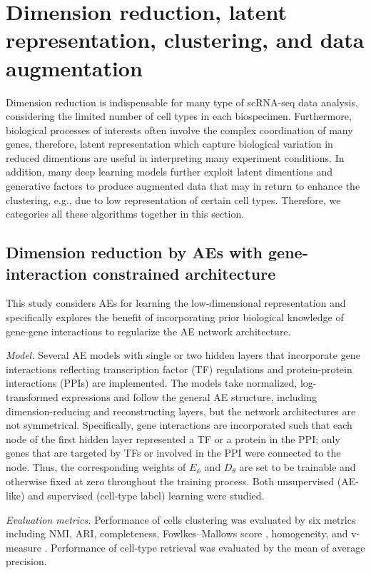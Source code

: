 \documentclass[
]{book}
\begin{document}
\hypertarget{ch-5-3}{%
\section{Dimension reduction, latent representation, clustering, and data augmentation}\label{ch-5-3}}

Dimension reduction is indispensable for many type of scRNA-seq data analysis, considering the limited number of cell types in each biospecimen. Furthermore, biological processes of interests often involve the complex coordination of many genes, therefore, latent representation which capture biological variation in reduced dimentions are useful in interpreting many experiment conditions. In addition, many deep learning models further exploit latent dimentions and generative factors to produce augmented data that may in return to enhance the clustering, e.g., due to low representation of certain cell types. Therefore, we categories all these algorithms together in this section.

\hypertarget{ch-5-3-1}{%
\subsection{Dimension reduction by AEs with gene-interaction constrained architecture}\label{ch-5-3-1}}

This study \citep{RN193} considers AEs for learning the low-dimensional representation and specifically explores the benefit of incorporating prior biological knowledge of gene-gene interactions to regularize the AE network architecture.

\emph{Model.} Several AE models with single or two hidden layers that incorporate gene interactions reflecting transcription factor (TF) regulations and protein-protein interactions (PPIs) are implemented. The models take normalized, log-transformed expressions and follow the general AE structure, including dimension-reducing and reconstructing layers, but the network architectures are not symmetrical. Specifically, gene interactions are incorporated such that each node of the first hidden layer represented a TF or a protein in the PPI; only genes that are targeted by TFs or involved in the PPI were connected to the node. Thus, the corresponding weights of \(E_{\phi}\) and \(D_{\theta}\) are set to be trainable and otherwise fixed at zero throughout the training process. Both unsupervised (AE-like) and supervised (cell-type label) learning were studied.

\emph{Evaluation metrics.} Performance of cells clustering was evaluated by six metrics including NMI, ARI, completeness, Fowlkes--Mallows score \citep{RN187}, homogeneity, and v-measure \citep{RN104}. Performance of cell-type retrieval was evaluated by the mean of average precision.
\end{document}
